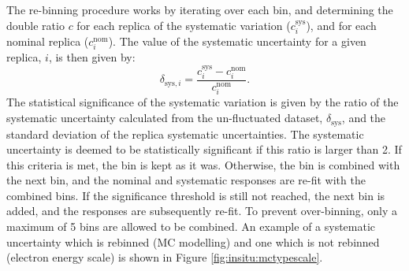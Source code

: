The re-binning procedure works by iterating over each \ptref bin, and determining the double ratio $c$ for each replica of the systematic variation ($c_{i}^{\text{sys}}$), and for each nominal replica ($c_{i}^{\text{nom}}$). The value of the systematic uncertainty for a given replica, $i$, is then given by: 
\begin{equation}
\delta_{\text{sys},i}=\frac{c_{i}^{\text{sys}}-c_{i}^{\text{nom}}}{c_{i}^{\text{nom}}}.
\end{equation}
The statistical significance of the systematic variation is given by the ratio of the systematic uncertainty calculated from the un-fluctuated dataset, $\delta_{\text{sys}}$, and the standard deviation of the replica systematic uncertainties. The systematic uncertainty is deemed to be statistically significant if this ratio is larger than 2. If this criteria is met, the bin is kept as it was. Otherwise, the \ptref bin is combined with the next bin, and the nominal and systematic responses are re-fit with the combined bins. If the significance threshold is still not reached, the next \ptref bin is added, and the responses are subsequently re-fit. To prevent over-binning, only a maximum of 5 bins are allowed to be combined. An example of a systematic uncertainty which is rebinned (MC modelling) and one which is not rebinned (electron energy scale) is shown in Figure \ref{fig:insitu:mctypescale}.

